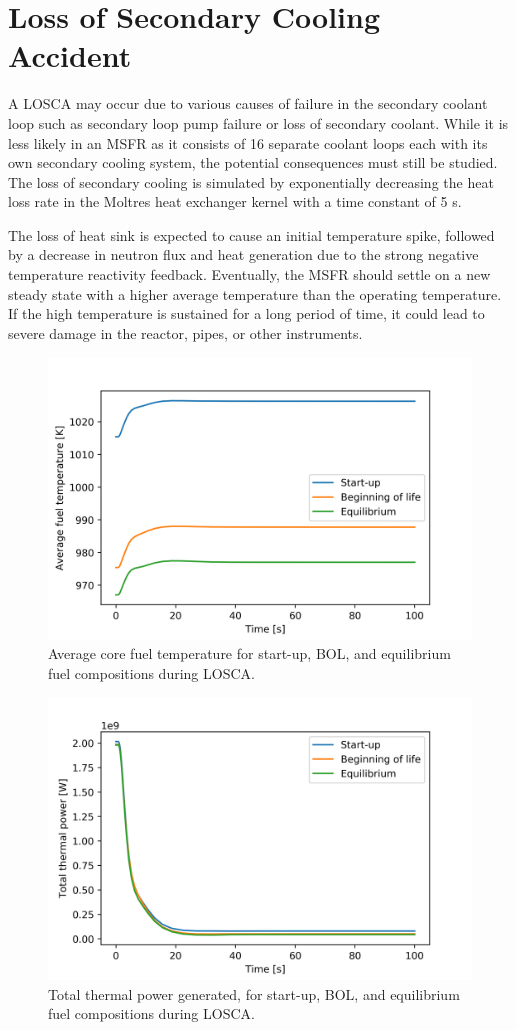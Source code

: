 \documentclass{anstrans}
\begin{document}
\section{Loss of Secondary Cooling Accident}

	A \gls{LOSCA} may occur due to various causes of failure in the secondary
	coolant loop such as secondary loop pump failure or loss of secondary
	coolant. While it is less likely in an \gls{MSFR} as it consists of 16
	separate coolant loops each with its own secondary cooling system, the
	potential consequences must still be studied.
	The loss of secondary cooling is simulated by exponentially decreasing
	the heat loss rate in the Moltres heat exchanger kernel with a time
	constant of 5 s.
	
	The loss of heat sink is expected to cause an initial temperature spike,
	followed by a decrease in neutron flux and heat generation due to the
	strong negative temperature reactivity feedback. Eventually, the
	\gls{MSFR} should settle on a new steady state with a higher average
	temperature than the operating temperature. If the high temperature is
	sustained for a long period of time, it could lead to severe damage
	in the reactor, pipes, or other instruments.
	
\begin{figure}[b] 
	\centering
	\includegraphics[width=.53\textwidth]{./figures/loscatemp}
	\captionsetup{justification=centering}
	\caption{Average core fuel temperature for start-up, \gls{BOL}, and
	equilibrium fuel compositions during \gls{LOSCA}.}
	\label{fig:loscatemp}
\end{figure} 
%
\begin{figure}[t] 
	\centering
	\includegraphics[width=.53\textwidth]{./figures/loscaheat}
	\captionsetup{justification=centering}
	\caption{Total thermal power generated, for start-up, \gls{BOL}, and
	 equilibrium fuel compositions during \gls{LOSCA}.}
	\label{fig:loscaheat}
\end{figure} 
\end{document}
